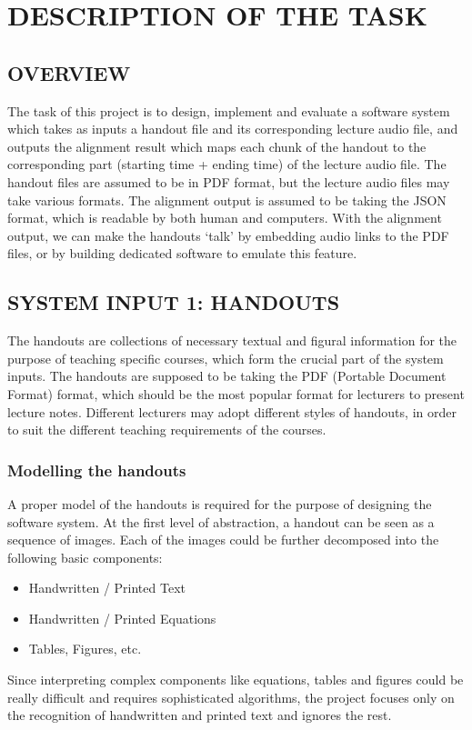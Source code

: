 \documentclass[12pt]{article}
\begin{document}
\section{DESCRIPTION OF THE TASK}

\subsection{OVERVIEW}

The task of this project is to design, implement and evaluate a software system which takes as inputs a handout file and its corresponding lecture audio file, and outputs the alignment result which maps each chunk of the handout to the corresponding part (starting time + ending time) of the lecture audio file. The handout files are assumed to be in PDF format, but the lecture audio files may take various formats. The alignment output is assumed to be taking the JSON format, which is readable by both human and computers. With the alignment output, we can make the handouts `talk' by embedding audio links to the PDF files, or by building dedicated software to emulate this feature. 

\subsection{SYSTEM INPUT 1: HANDOUTS}
\label{sec:input-handout}

The handouts are collections of necessary textual and figural information for the purpose of teaching specific courses, which form the crucial part of the system inputs. The handouts are supposed to be taking the PDF (Portable Document Format) format, which should be the most popular format for lecturers to present lecture notes. Different lecturers may adopt different styles of handouts, in order to suit the different teaching requirements of the courses. 

\subsubsection{Modelling the handouts}

A proper model of the handouts is required for the purpose of designing the software system. At the first level of abstraction, a handout can be seen as a sequence of images. Each of the images could be further decomposed into the following basic components:
\begin{itemize}
    \setlength{\itemsep}{0.05em}
    \item Handwritten / Printed Text
    \item Handwritten / Printed Equations
    \item Tables, Figures, etc.
\end{itemize}
Since interpreting complex components like equations, tables and figures could be really difficult and requires sophisticated algorithms, the project focuses only on the recognition of handwritten and printed text and ignores the rest.
\end{document}
